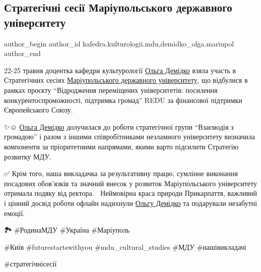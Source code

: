  
 
 
 
 

\subsection{Стратегічні сесії Маріупольського державного університету}
\label{sec:26_05_2023.fb.kafedra.kulturologii.mdu.1.strategic_sessions_mariupol_university}
 
\ifcmt
 author_begin
   author_id kafedra.kulturologii.mdu,demidko_olga.mariupol
 author_end
\fi

22-25 травня доцентка кафедри культурології \href{\urlDemidkoIA}{Ольга Демідко} взяла участь в
Стратегічних сесіях \href{\urlMduIA}{Маріупольського державного університету}, що відбулися в
рамках проєкту \enquote{Відродження переміщених університетів: посилення
конкурентоспроможності, підтримка громад} REDU за фінансової підтримки
Європейського Союзу.

✨️☺️ \href{\urlDemidkoIA}{Ольга Демідко} долучилася до роботи стратегічної групи
\enquote{Взаємодія з громадою} і разом з іншими співробітниками незламного університету
визначила компоненти за пріоритетними напрямами, якими варто підсилити
Стратегію розвитку МДУ.

✅️👏Крім того, наша викладачка  за результативну працю,
сумлінне виконання посадових обов'язків та значний внесок у розвиток
Маріупольського університету  отримала подяку від ректора. 🥰🎉Неймовірна краса
природи Прикарпаття, важливий і цінний досвід роботи офлайн надихнули \href{\urlDemidkoIA}{Ольгу
Демідко} та подарували незабутні емоції. 

🏞💛\#РодинаМДУ  \#Україна \#Маріуполь

\#Київ  \#futurestartswithyou  \#mdu\_cultural\_studies \#МДУ  \#нашівикладачі

\#стратегічнісесії
